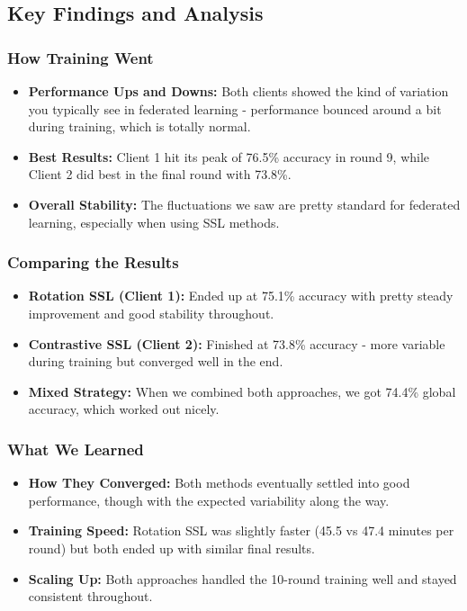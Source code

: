 \documentclass[a4paper, 10 pt, conference]{ieeeconf}
\begin{document}
\subsection{Key Findings and Analysis}

\subsubsection{How Training Went}
\begin{itemize}
\item \textbf{Performance Ups and Downs:} Both clients showed the kind of variation you typically see in federated learning - performance bounced around a bit during training, which is totally normal.
\item \textbf{Best Results:} Client 1 hit its peak of 76.5\% accuracy in round 9, while Client 2 did best in the final round with 73.8\%.
\item \textbf{Overall Stability:} The fluctuations we saw are pretty standard for federated learning, especially when using SSL methods.
\end{itemize}

\subsubsection{Comparing the Results}
\begin{itemize}
\item \textbf{Rotation SSL (Client 1):} Ended up at 75.1\% accuracy with pretty steady improvement and good stability throughout.
\item \textbf{Contrastive SSL (Client 2):} Finished at 73.8\% accuracy - more variable during training but converged well in the end.
\item \textbf{Mixed Strategy:} When we combined both approaches, we got 74.4\% global accuracy, which worked out nicely.
\end{itemize}

\subsubsection{What We Learned}
\begin{itemize}
\item \textbf{How They Converged:} Both methods eventually settled into good performance, though with the expected variability along the way.
\item \textbf{Training Speed:} Rotation SSL was slightly faster (45.5 vs 47.4 minutes per round) but both ended up with similar final results.
\item \textbf{Scaling Up:} Both approaches handled the 10-round training well and stayed consistent throughout.
\end{itemize}
\end{document}
